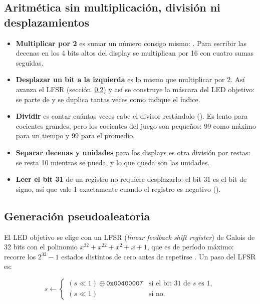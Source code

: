 \subsection{Aritmética sin multiplicación, división ni desplazamientos}
\label{sec:sin-mul}

\begin{itemize}
  \item \textbf{Multiplicar por 2} es sumar un número consigo mismo:
        . Para escribir las decenas en los 4 bits altos del display
        se multiplican por 16 con cuatro sumas seguidas.
  \item \textbf{Desplazar un bit a la izquierda} es lo mismo que multiplicar por 2. Así
        avanza el LFSR (sección~\ref{sec:lfsr}) y así se construye la máscara del LED
        objetivo: se parte de  y se duplica tantas veces como indique el índice.
  \item \textbf{Dividir} es contar cuántas veces cabe el divisor restándolo
        (). Es lento para cocientes grandes, pero los cocientes del juego son
        pequeños: 99 como máximo para un tiempo y 99 para el promedio.
  \item \textbf{Separar decenas y unidades} para los displays es otra división por
        restas: se resta 10 mientras se pueda, y lo que queda son las unidades.
  \item \textbf{Leer el bit 31} de un registro no requiere desplazarlo: el bit 31 es el
        bit de signo, así que vale 1 exactamente cuando el registro es negativo
        ().
\end{itemize}

\subsection{Generación pseudoaleatoria}
\label{sec:lfsr}

El LED objetivo se elige con un LFSR (\emph{linear feedback shift register}) de Galois
de 32 bits con el polinomio $x^{32} + x^{22} + x^{2} + x + 1$, que es de período
máximo: recorre los $2^{32}-1$ estados distintos de cero antes de repetirse
\cite{xapp052}. Un paso del LFSR es:

\[
  s \leftarrow
  \begin{cases}
    (s \ll 1) \oplus \texttt{0x00400007} & \text{si el bit 31 de } s \text{ es } 1, \\
    (s \ll 1) & \text{si no.}
  \end{cases}
\]

